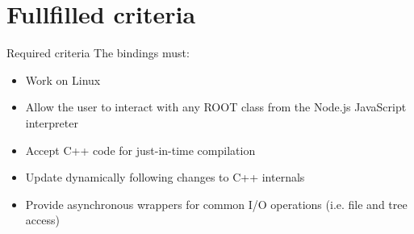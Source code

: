 \section{Fullfilled criteria}

\begin{frame}{Required criteria}
    The bindings must:
     \begin{itemize}
		\item Work on Linux \uncover<2->{\checkmark}
        \item Allow the user to interact with any ROOT class from the Node.js JavaScript interpreter 
        \item Accept C++ code for just-in-time compilation 
        \item Update dynamically following changes to C++ internals 
        \item Provide asynchronous wrappers for common I/O operations (i.e. file and tree access) 
     \end{itemize}
\end{frame}

